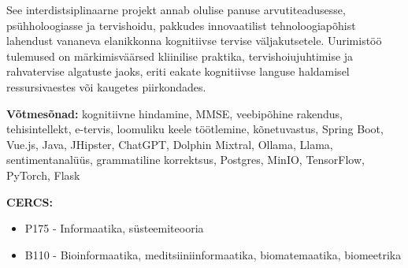 {{See interdistsiplinaarne projekt annab olulise panuse arvutiteadusesse, psühholoogiasse ja tervishoidu, pakkudes innovaatilist tehnoloogiapõhist lahendust vananeva elanikkonna kognitiivse tervise väljakutsetele. Uurimistöö tulemused on märkimisväärsed kliinilise praktika, tervishoiujuhtimise ja rahvatervise algatuste jaoks, eriti eakate kognitiivse languse haldamisel ressursivaestes või kaugetes piirkondades.


\vspace*{1ex}
\noindent\textbf{Võtmesõnad:} kognitiivne hindamine, MMSE, veebipõhine rakendus, tehisintellekt, e-tervis, loomuliku keele töötlemine, kõnetuvastus, Spring Boot, Vue.js, Java, JHipster, ChatGPT, Dolphin Mixtral, Ollama, Llama, sentimentanalüüs, grammatiline korrektsus, Postgres, MinIO, TensorFlow, PyTorch, Flask

\vspace*{1ex}
\newpage
\noindent\textbf{CERCS:} 
\begin{itemize}
    \item P175 - Informaatika, süsteemiteooria
    \item B110 - Bioinformaatika, meditsiiniinformaatika, biomatemaatika, biomeetrika
\end{itemize}
\vspace*{1ex}
}}%



\newpage
\tableofcontents